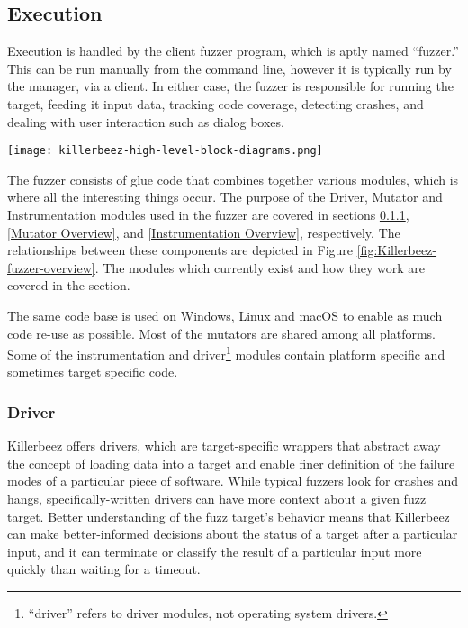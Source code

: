 \subsection{Execution}
Execution is handled by the client fuzzer program, which is aptly named ``fuzzer.''
This can be run manually from the command line, however it is typically run by
the manager, via a \BOINC{} client.  In either case, the fuzzer is responsible
for running the target, feeding it input data, tracking code
coverage, detecting crashes, and dealing with user interaction such as dialog
boxes.

\begin{figure*}[htb]
\centering
\texttt{[image: killerbeez-high-level-block-diagrams.png]}
\caption{Killerbeez Fuzzer Overview}
\label{fig:Killerbeez-fuzzer-overview}
\end{figure*}

The fuzzer consists of glue code that combines together various
modules, which is where all the interesting things occur. The purpose of
the Driver, Mutator and Instrumentation modules used in the fuzzer are covered in sections
\ref{Driver Overview}, \ref{Mutator Overview}, and
\ref{Instrumentation Overview}, respectively.  The relationships between these components are depicted in Figure \ref{fig:Killerbeez-fuzzer-overview}. The modules which currently
exist and how they work are covered in the 
section.

The same code base is used on Windows, Linux and macOS to enable as much code
re-use as possible.  Most of the mutators are shared among all platforms.
Some of the instrumentation and driver\footnote{
``driver'' refers to driver modules, not operating system drivers.}
modules contain platform specific and sometimes target specific code.

\subsubsection{Driver} \label{Driver Overview}
Killerbeez offers drivers, which are target-specific wrappers that abstract
away the concept of loading data into a target and enable finer
definition of the failure modes of a particular piece of software. While
typical fuzzers look for crashes and hangs, specifically-written drivers can
have more context about a given fuzz target.  Better understanding of the fuzz
target's behavior means that Killerbeez can make better-informed decisions
about the status of a target after a particular input, and it can terminate or
classify the result of a particular input more quickly than waiting for a
timeout.

